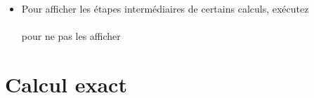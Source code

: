 \documentclass[a4paper,11pt]{book}
\begin{document}
\begin{giacjshere}
\begin{itemize}
\`a repr\'esenter des vecteurs. Les listes de listes de m\^eme taille
servent \`a repr\'esenter des matrices. On acc\`ede \`a un \'el\'ement
d'une liste en donnant le nom de variable de la liste puis l'indice
de l'\'el\'ement entre crochet, en commen\c{c}ant \`a 0 (mettre deux crochets
pour commencer \`a 1).
\item Pour afficher les \'etapes interm\'ediaires de certains calculs, ex\'ecutez\\
\\
pour ne pas les afficher\\
\end{itemize}

\section{Calcul exact}

\end{giacjshere}
\end{document}
